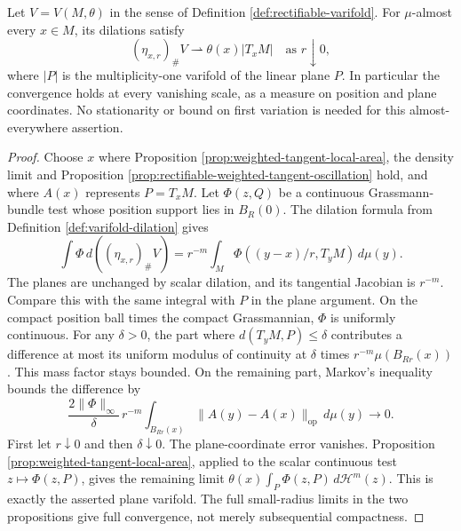 \begin{theorem}\label{thm:rectifiable-varifold-ae-blowup}
Let $V=V(M,\theta)$ in the sense of Definition \ref{def:rectifiable-varifold}. For $\mu$-almost every $x\in M$, its dilations satisfy
\[
 (\eta_{x,r})_\#V\rightharpoonup\theta(x)|T_xM|
 \quad\text{as }r\downarrow0,
\]
where $|P|$ is the multiplicity-one varifold of the linear plane $P$. In particular the convergence holds at every vanishing scale, as a measure on position and plane coordinates. No stationarity or bound on first variation is needed for this almost-everywhere assertion.
\end{theorem}
\begin{proof}
Choose $x$ where Proposition \ref{prop:weighted-tangent-local-area}, the density limit and Proposition \ref{prop:rectifiable-weighted-tangent-oscillation} hold, and where $A(x)$ represents $P=T_xM$. Let $\Phi(z,Q)$ be a continuous Grassmann-bundle test whose position support lies in $B_R(0)$. The dilation formula from Definition \ref{def:varifold-dilation} gives
\[
 \int\Phi\,d((\eta_{x,r})_\#V)
 =r^{-m}\int_M\Phi((y-x)/r,T_yM)\,d\mu(y).
\]
The planes are unchanged by scalar dilation, and its tangential Jacobian is $r^{-m}$. Compare this with the same integral with $P$ in the plane argument. On the compact position ball times the compact Grassmannian, $\Phi$ is uniformly continuous. For any $\delta>0$, the part where $d(T_yM,P)\leq\delta$ contributes a difference at most its uniform modulus of continuity at $\delta$ times $r^{-m}\mu(B_{Rr}(x))$. This mass factor stays bounded. On the remaining part, Markov's inequality bounds the difference by
\[
 \frac{2\|\Phi\|_\infty}{\delta}\,r^{-m}
 \int_{B_{Rr}(x)}\|A(y)-A(x)\|_{\mathrm{op}}\,d\mu(y)\longrightarrow0.
\]
First let $r\downarrow0$ and then $\delta\downarrow0$. The plane-coordinate error vanishes. Proposition \ref{prop:weighted-tangent-local-area}, applied to the scalar continuous test $z\mapsto\Phi(z,P)$, gives the remaining limit $\theta(x)\int_P\Phi(z,P)\,d\mathcal H^m(z)$. This is exactly the asserted plane varifold. The full small-radius limits in the two propositions give full convergence, not merely subsequential compactness.
\end{proof}


